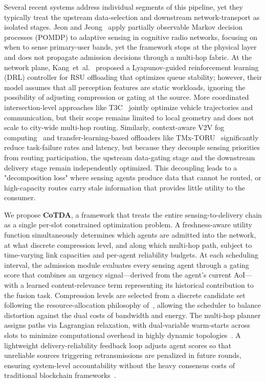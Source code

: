 \documentclass[final,3p,times,review,sort&compress]{elsarticle}
\begin{document}
Several recent systems address individual segments of this pipeline, yet they typically treat the upstream data-selection and downstream network-transport as isolated stages. Jeon and Jeong~\cite{JEON20123318} apply partially observable Markov decision processes (POMDP) to adaptive sensing in cognitive radio networks, focusing on when to sense primary-user bands, yet the framework stops at the physical layer and does not propagate admission decisions through a multi-hop fabric. At the network plane, Kang~et~al.~\cite{KANG2026111852} proposed a Lyapunov-guided reinforcement learning (DRL) controller for RSU offloading that optimizes queue stability; however, their model assumes that all perception features are static workloads, ignoring the possibility of adjusting compression or gating at the source. More coordinated intersection-level approaches like T3C~\cite{WU2024104886} jointly optimize vehicle trajectories and communication, but their scope remains limited to local geometry and does not scale to city-wide multi-hop routing. Similarly, context-aware V2V fog computing~\cite{RAHMAN2020100236} and transfer-learning-based offloaders like TMx-TORU~\cite{AKYILDIZ2026108292} significantly reduce task-failure rates and latency, but because they decouple sensing priorities from routing participation, the upstream data-gating stage and the downstream delivery stage remain independently optimized. This decoupling leads to a "decomposition loss" where sensing agents produce data that cannot be routed, or high-capacity routes carry stale information that provides little utility to the consumer.

We propose \textbf{CoTDA}, a framework that treats the entire sensing-to-delivery chain as a single per-slot constrained optimization problem. A freshness-aware utility function simultaneously determines which agents are admitted into the network, at what discrete compression level, and along which multi-hop path, subject to time-varying link capacities and per-agent reliability budgets. At each scheduling interval, the admission module evaluates every sensing agent through a gating score that combines an urgency signal—derived from the agent's current AoI—with a learned content-relevance term representing its historical contribution to the fusion task. Compression levels are selected from a discrete candidate set following the resource-allocation philosophy of~\cite{SEKARAN2021107649}, allowing the scheduler to balance distortion against the dual costs of bandwidth and energy. The multi-hop planner assigns paths via Lagrangian relaxation, with dual-variable warm-starts across slots to minimize computational overhead in highly dynamic topologies~\cite{AKYILDIZ2026108292}. A lightweight delivery-reliability feedback loop adjusts agent scores so that unreliable sources triggering retransmissions are penalized in future rounds, ensuring system-level accountability without the heavy consensus costs of traditional blockchain frameworks~\cite{SARKAR2022100533}.
\end{document}
